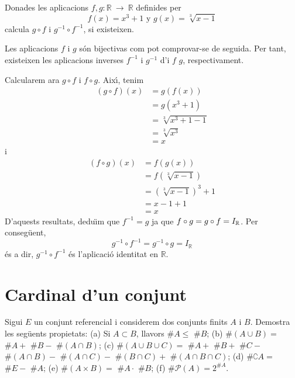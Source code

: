 \begin{exercici}
Donades les aplicacions $f,g:\mathbb{R}~\longrightarrow ~\mathbb{R}$
definides per%
\begin{equation*}
f(x)=x^{3}+1\text{ \ \ \ \ y \ \ \ \ }g(x)=\sqrt[3]{x-1}
\end{equation*}%
calcula $g\circ f$ i $g^{-1}\circ f^{-1}$, si existeixen.
\end{exercici}

\begin{solucio}
Les aplicacions $f$ i $g$ s\'{o}n bijectivas com pot comprovar-se de
seguida. Per tant, existeixen les aplicacions inverses $f^{-1}$ i $g^{-1}$
d'i $f$ $g$, respectivament.

Calcularem ara $g\circ f$ i $f\circ g$. Aix\'{\i}, tenim%
\begin{align*}
(g\circ f)(x)& =g\left( f(x)\right) \\
& =g(x^{3}+1) \\
& =\sqrt[3]{x^{3}+1-1} \\
& =\sqrt[3]{x^{3}} \\
& =x
\end{align*}%
i%
\begin{align*}
(f\circ g)(x)& =f\left( g(x)\right) \\
& =f\left( \sqrt[3]{x-1}\right) \\
& =\left( \sqrt[3]{x-1}\right) ^{3}+1 \\
& =x-1+1 \\
& =x
\end{align*}%
D'aquests resultats, dedu\"{\i}m que $f^{-1}=g$ ja que $f\circ g=g\circ f=I_{%
\mathbb{R}}$. Per conseg\"{u}ent,%
\begin{equation*}
g^{-1}\circ f^{-1}=g^{-1}\circ g=I_{\mathbb{R}}
\end{equation*}%
\'{e}s a dir, $g^{-1}\circ f^{-1}$ \'{e}s l'aplicaci\'{o} identitat en $%
\mathbb{R}$.
\end{solucio}

\section{Cardinal d'un conjunt}

\begin{exercici}
Sigui $E$ un conjunt referencial i considerem dos conjunts finits $A$ i $B$.
Demostra les seg\"{u}ents propietats: (a) Si $A\subset B$, llavors $\#A\leq $
$\#B$; (b) $\#\left( A\cup B\right) =$ $\#A+$ $\#B-$ $\#\left( A\cap
B\right) $; (c) $\#\left( A\cup B\cup C\right) =$ $\#A+$ $\#B+$ $\#C-$ $%
\#\left( A\cap B\right) -$ $\#\left( A\cap C\right) -$ $\#\left( B\cap
C\right) +$ $\#\left( A\cap B\cap C\right) $; (d) $\#\complement A=$ $\#E-$ $%
\#A$; (e) $\#\left( A\times B\right) =$ $\#A\cdot $ $\#B$; (f) $\#\mathcal{P}%
(A)=2^{\#A}$.
\end{exercici}

